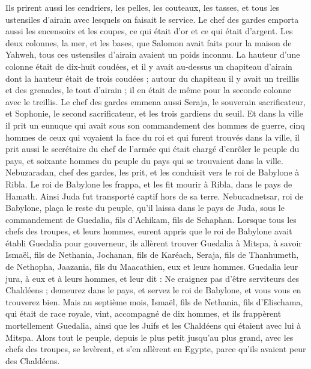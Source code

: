 \begin{multicols}{2}
Ils prirent aussi les cendriers, les pelles, les couteaux, les tasses, et tous les ustensiles d’airain avec lesquels on faisait le service.
Le chef des gardes emporta aussi les encensoirs et les coupes, ce qui était d’or et ce qui était d’argent.
Les deux colonnes, la mer, et les bases, que Salomon avait faits pour la maison de Yahweh, tous ces ustensiles d’airain avaient un poids inconnu.
La hauteur d’une colonne était de dix-huit coudées, et il y avait au-dessus un chapiteau d’airain dont la hauteur était de trois coudées ; autour du chapiteau il y avait un treillis et des grenades, le tout d’airain ; il en était de même pour la seconde colonne avec le treillis.
Le chef des gardes emmena aussi Seraja, le souverain sacrificateur, et Sophonie, le second sacrificateur, et les trois gardiens du seuil.
Et dans la ville il prit un eunuque qui avait sous son commandement des hommes de guerre, cinq hommes de ceux qui voyaient la face du roi et qui furent trouvés dans la ville, il prit aussi le secrétaire du chef de l’armée qui était chargé d’enrôler le peuple du pays, et soixante hommes du peuple du pays qui se trouvaient dans la ville.
Nebuzaradan, chef des gardes, les prit, et les conduisit vers le roi de Babylone à Ribla.
Le roi de Babylone les frappa, et les fit mourir à Ribla, dans le pays de Hamath. Ainsi Juda fut transporté captif hors de sa terre.
Nebucadnetsar, roi de Babylone, plaça le reste du peuple, qu’il laissa dans le pays de Juda, sous le commandement de Guedalia, fils d’Achikam, fils de Schaphan.
Lorsque tous les chefs des troupes, et leurs hommes, eurent appris que le roi de Babylone avait établi Guedalia pour gouverneur, ils allèrent trouver Guedalia à Mitspa, à savoir Ismaël, fils de Nethania, Jochanan, fils de Karéach, Seraja, fils de Thanhumeth, de Nethopha, Jaazania, fils du Maacathien, eux et leurs hommes.
Guedalia leur jura, à eux et à leurs hommes, et leur dit : Ne craignez pas d’être serviteurs des Chaldéens ; demeurez dans le pays, et servez le roi de Babylone, et vous vous en trouverez bien.
Mais au septième mois, Ismaël, fils de Nethania, fils d’Elischama, qui était de race royale, vint, accompagné de dix hommes, et ils frappèrent mortellement Guedalia, ainsi que les Juifs et les Chaldéens qui étaient avec lui à Mitspa.
Alors tout le peuple, depuis le plus petit jusqu’au plus grand, avec les chefs des troupes, se levèrent, et s’en allèrent en Egypte, parce qu’ils avaient peur des Chaldéens.

\end{multicols}
